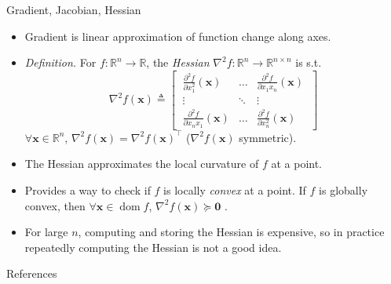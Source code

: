 \documentclass{beamer}
\numberwithin{equation}{section}
\begin{document}
\begin{frame}{Gradient, Jacobian, Hessian}
    \begin{itemize}
        \item
        Gradient is linear approximation of function change along axes.

        \item
        \textit{Definition.} For $ f : \mathbb{R}^n \rightarrow \mathbb{R} $,
        the \textit{Hessian} $ \nabla^2f : \mathbb{R}^n \rightarrow
        \mathbb{R}^{n \times n} $ is s.t.
        \begin{equation*}
            \nabla^2 f(\mathbf{x}) \triangleq \begin{bmatrix}
                \ \frac{\partial^2 f}{\partial x_1^2}(\mathbf{x}) & \ldots &
                    \frac{\partial^2 f}{\partial x_1x_n}(\mathbf{x}) \ \\
                \ \vdots & \ddots & \vdots \ \\
                \ \frac{\partial^2 f}{\partial x_nx_1}(\mathbf{x}) & \ldots &
                    \frac{\partial^2 f}{\partial x_n^2}(\mathbf{x}) \
            \end{bmatrix}
        \end{equation*}
        $ \forall \mathbf{x} \in \mathbb{R}^n $, $ \nabla^2f(\mathbf{x})
        = \nabla^2f(\mathbf{x})^\top $ ($ \nabla^2f(\mathbf{x}) $ symmetric).

        \item
        The Hessian approximates the local curvature of $ f $ at a point.

        \item
        Provides a way to check if $ f $ is locally \textit{convex} at a
        point. If $ f $ is globally convex, then $ \forall \mathbf{x} \in
        \operatorname{dom}f $, $ \nabla^2f(\mathbf{x}) \succeq \mathbf{0} $
        \cite{bv_convex_opt}.

        \item
        For large $ n $, computing and storing the Hessian is expensive, so
        in practice repeatedly computing the Hessian is not a good idea.
    \end{itemize}
\end{frame}

\begin{frame}{References}
    
    
\end{frame}
\end{document}
